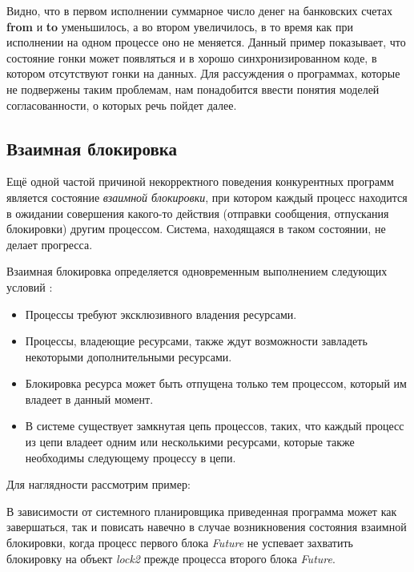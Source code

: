 \documentclass[14pt, openany]{book}
\begin{document}
Видно, что в первом исполнении суммарное число денег на банковских счетах \textbf{from} и \textbf{to} уменьшилось, а во втором увеличилось, в то время как при исполнении на одном процессе оно не меняется. Данный пример показывает, что состояние гонки может появляться и в хорошо синхронизированном коде, в котором отсутствуют гонки на данных. Для рассуждения о программах, которые не подвержены таким проблемам, нам понадобится ввести понятия моделей согласованности, о которых речь пойдет далее.

\subsection{Взаимная блокировка}
Ещё одной частой причиной некорректного поведения конкурентных программ является состояние \textit{взаимной блокировки}, при котором каждый процесс находится в ожидании совершения какого-то действия (отправки сообщения, отпускания блокировки) другим процессом. Система, находящаяся в таком состоянии, не делает прогресса. \par
Взаимная блокировка определяется одновременным выполнением следующих условий \cite{deadlock}:
\begin{itemize}
    \item Процессы требуют эксклюзивного владения ресурсами.
    \item Процессы, владеющие ресурсами, также ждут возможности завладеть некоторыми дополнительными ресурсами.
    \item Блокировка ресурса может быть отпущена только тем процессом, который им владеет в данный момент.
    \item В системе существует замкнутая цепь процессов, таких, что каждый процесс из цепи владеет одним или несколькими ресурсами, которые также необходимы следующему процессу в цепи.
\end{itemize}
Для наглядности рассмотрим пример:


В зависимости от системного планировщика приведенная программа может как завершаться, так и повисать навечно в случае возникновения состояния взаимной блокировки, когда процесс первого блока \textit{Future} не успевает захватить блокировку на объект \textit{lock2} прежде процесса второго блока \textit{Future}.
\end{document}
